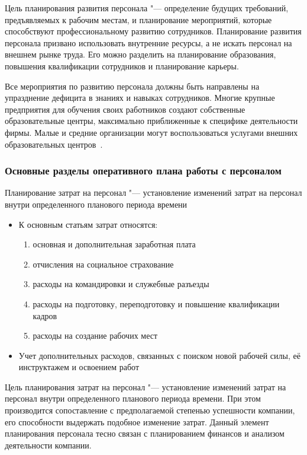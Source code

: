 \documentclass{../industrial-development}
\begin{document}
\alert{Цель планирования развития персонала} "---  определение будущих требований, предъявляемых к рабочим местам, и планирование мероприятий, которые способствуют профессиональному развитию сотрудников. Планирование развития персонала призвано использовать внутренние ресурсы, а не искать персонал на внешнем рынке труда. Его можно разделить на планирование образования, повышения квалификации сотрудников и планирование карьеры.

Все мероприятия по развитию персонала должны быть направлены на упразднение дефицита в знаниях и навыках сотрудников. Многие крупные предприятия для обучения своих работников создают собственные образовательные центры, максимально приближенные к специфике деятельности фирмы. Малые и средние организации могут воспользоваться услугами внешних образовательных центров~\cite{Durakova}.

\begin{frame} \frametitle{Основные разделы оперативного плана работы с персоналом}

\alert{Планирование затрат на персонал} "--- установление изменений затрат на персонал внутри определенного планового периода времени
  \begin{itemize}
 \item К основным статьям затрат относятся: 
  \begin{enumerate}
\item основная и дополнительная заработная плата
\item отчисления на социальное страхование
\item расходы на командировки и служебные разъезды
\item расходы на подготовку, переподготовку и повышение квалификации кадров
\item расходы на создание рабочих мест
	  \end{enumerate}
\item Учет дополнительных расходов, связанных с поиском новой рабочей силы, её инструктажем и освоением работ
	  \end{itemize}

\end{frame}

\lecturenotes

\alert{Цель планирования затрат на персонал} "--- установление изменений затрат на персонал внутри определенного планового периода времени. При этом производится сопоставление с предполагаемой степенью успешности компании, его способности выдержать подобное изменение затрат. Данный элемент планирования персонала тесно связан с планированием финансов и анализом деятельности компании.
\end{document}
